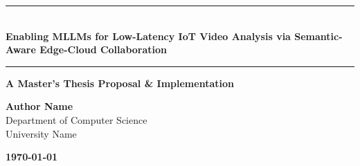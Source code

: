 \documentclass[11pt, a4paper, oneside]{report}
\begin{document}
\begin{titlepage}
    \pagecolor{primary}
    \color{white}
    \begin{center}
        \vspace*{2cm}
        
        \rule{\textwidth}{1pt}\\[0.5cm]
        {\Huge \textbf{Enabling MLLMs for Low-Latency IoT Video Analysis via Semantic-Aware Edge-Cloud Collaboration}}\\[0.4cm]
        \rule{\textwidth}{1pt}
        
        \vspace{2cm}
        
        {\Large \textbf{A Master's Thesis Proposal \& Implementation}}
        
        \vspace{3cm}
        
        {\Large \textbf{Author Name}}\\
        \vspace{0.2cm}
        {\large Department of Computer Science}\\
        {\large University Name}
        
        \vfill
        
        \begin{tcolorbox}[colback=white, colframe=white, arc=5pt, width=0.6\textwidth, center]
            \centering\color{primary}\large \textbf{\today}
        \end{tcolorbox}
        
    \end{center}
\end{titlepage}
\nopagecolor %

\tableofcontents
\listoffigures
\newpage
\end{document}
